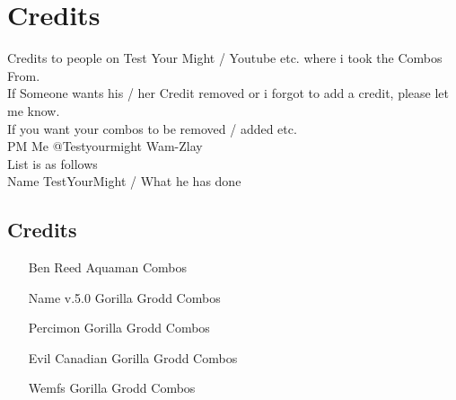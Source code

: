 \documentclass[main.tex]{subfiles}
\begin{document}
\chapter{Credits}

Credits to people on Test Your Might / Youtube etc. where i took the Combos From.\\If Someone wants his / her Credit removed or i forgot to add a credit, please let me know.\\
If you want your combos to be removed / added etc.\\
PM Me @Testyourmight Wam-Zlay\\

List is as follows\\

Name TestYourMight / What he has done\\

\section{Credits}

\begin{itemize}
\item [Ben Reed] Aquaman Combos 
\item [Name v.5.0] Gorilla Grodd Combos 
\item [Percimon] Gorilla Grodd Combos
\item [Evil Canadian] Gorilla Grodd Combos
\item [Wemfs] Gorilla Grodd Combos
\end{itemize}
\end{document}
